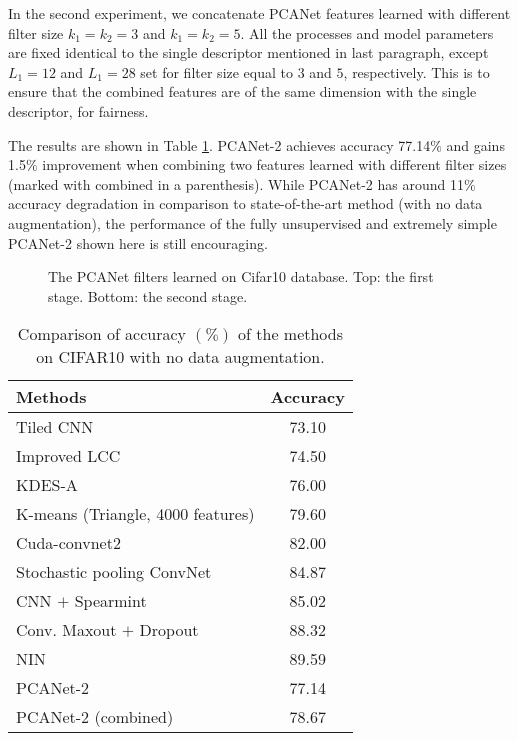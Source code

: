 \documentclass[10pt,journal,compsoc]{IEEEtran}
\begin{document}
In the second experiment, we concatenate PCANet features learned with different filter size $k_1 = k_2 = 3$ and $k_1 = k_2 = 5$. All the processes and model parameters are fixed identical to the single descriptor mentioned in last paragraph, except $L_1 = 12$ and $L_1 = 28$ set for filter size equal to $3$ and $5$, respectively. This is to ensure that the combined features are of the same dimension with the single descriptor, for fairness.

The results are shown in Table \ref{table: cifar10}. PCANet-2 achieves accuracy 77.14$\%$ and gains 1.5$\%$ improvement when combining two features learned with different filter sizes (marked with combined in a parenthesis). While PCANet-2 has around 11$\%$ accuracy degradation in comparison to state-of-the-art method (with no data augmentation), the performance of the fully unsupervised and extremely simple PCANet-2 shown here is still encouraging.


\begin{figure}[t]
\centering
{}
\caption{The PCANet filters learned on Cifar10 database. Top: the first stage. Bottom: the second stage. }\label{fig: cifar10_filters}
\end{figure}

\begin{table}[tbp]\centering
\caption{Comparison of accuracy $(\%)$ of the methods on CIFAR10 with no data augmentation.}
\begin{tabular}{l|c}
  \hline
Methods         &  Accuracy   \\  \hline \hline
  Tiled CNN \cite{Le2010} & 73.10 \\
  Improved LCC \cite{Yu2010} & 74.50 \\
  KDES-A \cite{Bo2010} & 76.00 \\
  K-means (Triangle, 4000 features) \cite{Coates2010} & 79.60 \\
  Cuda-convnet2 \cite{Krizhevsky2014} & 82.00 \\
  Stochastic pooling ConvNet \cite{Zeiler2013} & 84.87   \\
  CNN $+$ Spearmint \cite{Snoek2012} & 85.02 \\
  Conv. Maxout $+$ Dropout \cite{Goodfellow2013} & 88.32   \\
  NIN \cite{Lin2014}  & 89.59      \\  \hline
  PCANet-2  & 77.14  \\
  PCANet-2 (combined) & 78.67 \\
  \hline
\end{tabular}\label{table: cifar10}
\end{table}
\end{document}
